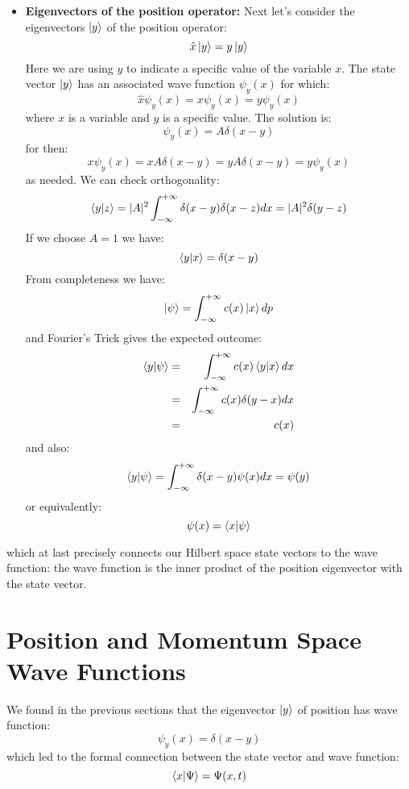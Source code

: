 \documentclass[12pt]{book}
\begin{document}
\begin{itemize}
\item {\bf Eigenvectors of the position operator:}  Next let's consider the eigenvectors $\ket{y}$ of the position operator:
$$\hat{x} \ket{y} = y \ket{y}$$
Here we are using $y$ to indicate a specific value of the variable $x$.  The state vector $\ket{y}$ has an associated wave function $\psi_y(x)$ for which:
$$\hat{x} \psi_y(x) = x \psi_y(x) = y \psi_y(x)$$
where $x$ is a variable and $y$ is a specific value.  The solution is:
$$\psi_y(x) = A \delta(x-y)$$
for then:
$$x \psi_y(x) = x A \delta(x-y) = y A \delta(x-y) = y \psi_y(x)$$
as needed.  We can check orthogonality:
$$\braket{y|z} = |A|^2 \int_{-\infty}^{+\infty} \delta(x-y) \delta(x-z) dx = |A|^2 \delta(y-z)$$
If we choose $A=1$ we have:
$$\braket{y|x} = \delta(x-y)$$
From completeness we have:
$$\ket{\psi} = \int_{-\infty}^{+\infty} c(x) \ket{x} dp $$
and Fourier's Trick gives the expected outcome:
\begin{eqnarray*}
\braket{y|\psi} &=& \int_{-\infty}^{+\infty} c(x) \braket{y|x} dx \\
                &=& \int_{-\infty}^{+\infty} c(x) \delta(y-x) dx \\
                &=& c(x) \\
\end{eqnarray*}
and also:
$$\braket{y|\psi} = \int_{-\infty}^{+\infty} \delta(x-y) \psi(x) dx = \psi(y)$$
or equivalently:
$$\psi(x) = \braket{x|\psi}$$
\end{itemize}
which at last precisely connects our Hilbert space state vectors to the wave function: the wave function is the inner product of the position eigenvector with the state vector.

\section{Position and Momentum Space Wave Functions}

We found in the previous sections that the eigenvector $\ket{y}$ of position has wave function:
$$\psi_y(x) = \delta(x-y)$$
which led to the formal connection between the state vector and wave function:
$$\braket{x|\Psi} = \Psi(x,t)$$
\end{document}
